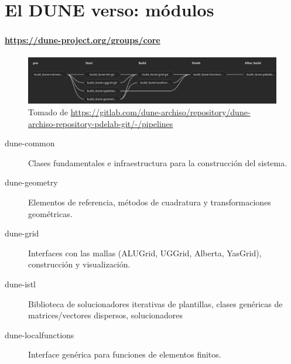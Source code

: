 \section{El DUNE verso: módulos}

\begin{frame}[fragile]
	\frametitle{\secname}
	\framesubtitle{\url{https://dune-project.org/groups/core}}

	\begin{figure}[ht!]
		\centering
		\includegraphics[width=14.6cm]{dependences}
		\caption{Tomado de \url{https://gitlab.com/dune-archiso/repository/dune-archiso-repository-pdelab-git/-/pipelines}}
	\end{figure}

	\begin{description}
		\item[dune-common]

			Clases fundamentales e infraestructura para la construcción del sistema.

		\item[dune-geometry]

			Elementos de referencia, métodos de cuadratura y transformaciones geométricas.

		\item[dune-grid]

			Interfaces con las mallas (ALUGrid, UGGrid, Alberta, YasGrid), construcción y visualización.

		\item[dune-istl]

			Biblioteca de solucionadores iterativas de plantillas, clases genéricas de matrices/vectores dispersos, solucionadores

		\item[dune-localfunctions]

			Interface genérica para funciones de elementos finitos.
	\end{description}

\end{frame}

